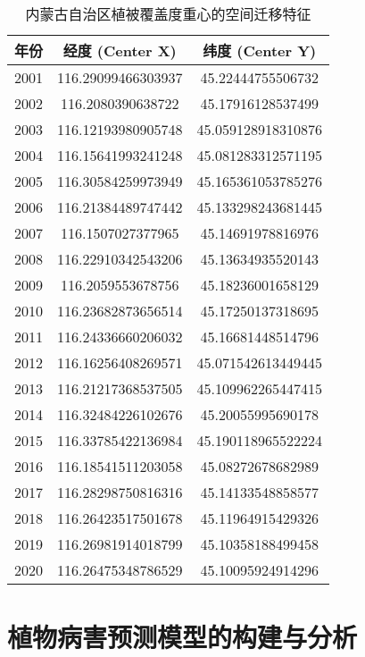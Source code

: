 \documentclass[AutoFakeBold]{LZUThesis-PgD&PhD}
\begin{document}
		\begin{table}[H] 
			\centering
			\begin{tabular}{|c|c|c|}
				\hline
				\textbf{年份} & \textbf{经度 (Center X)} & \textbf{纬度 (Center Y)} \\
				\hline
				2001 & 116.29099466303937 & 45.22444755506732 \\
				2002 & 116.2080390638722 & 45.17916128537499 \\
				2003 & 116.12193980905748 & 45.059128918310876 \\
				2004 & 116.15641993241248 & 45.081283312571195 \\
				2005 & 116.30584259973949 & 45.165361053785276 \\
				2006 & 116.21384489747442 & 45.133298243681445 \\
				2007 & 116.1507027377965 & 45.14691978816976 \\
				2008 & 116.22910342543206 & 45.13634935520143 \\
				2009 & 116.2059553678756 & 45.18236001658129 \\
				2010 & 116.23682873656514 & 45.17250137318695 \\
				2011 & 116.24336660206032 & 45.16681448514796 \\
				2012 & 116.16256408269571 & 45.071542613449445 \\
				2013 & 116.21217368537505 & 45.109962265447415 \\
				2014 & 116.32484226102676 & 45.20055995690178 \\
				2015 & 116.33785422136984 & 45.190118965522224 \\
				2016 & 116.18541511203058 & 45.08272678682989 \\
				2017 & 116.28298750816316 & 45.14133548858577 \\
				2018 & 116.26423517501678 & 45.11964915429326 \\
				2019 & 116.26981914018799 & 45.10358188499458 \\
				2020 & 116.26475348786529 & 45.10095924914296 \\
				\hline
			\end{tabular}
			\caption{内蒙古自治区植被覆盖度重心的空间迁移特征}
		\end{table}



        \chapter{植物病害预测模型的构建与分析}
\end{document}
